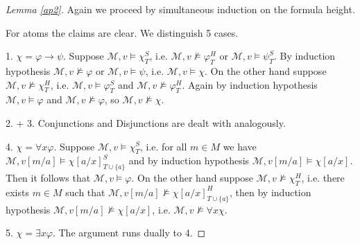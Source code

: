 \documentclass[a4paper,UKenglish,cleveref, autoref, thm-restate]{lipics-v2021}
\begin{document}
\begin{proof}[Lemma \ref{ap2}]
	Again we proceed by simultaneous induction on the formula height.
	
	For atoms the claims are clear. We distinguish 5 cases.
	
	1. $\chi = \varphi\to\psi$. Suppose $\mathcal M, v\models\chi^S_T$, i.e. $\mathcal M, v\not\models\varphi^H_T$ or $\mathcal M, v\models\psi^S_T$. By induction hypothesis $\mathcal M, v\not\models \varphi$ or $\mathcal M, v\models\psi$, i.e. $\mathcal M, v\models \chi$. On the other hand suppose $\mathcal M, v\not\models\chi^H_T$, i.e. $\mathcal M, v\models\varphi^S_T$ and $\mathcal M, v\not\models\varphi^H_T$. Again by induction hypothesis $\mathcal M,v\models\varphi$ and $\mathcal M, v\not\models \varphi$, so $\mathcal M, v\not\models\chi$.
	
	2. + 3. Conjunctions and Disjunctions are dealt with analogously.
	
	4. $\chi = \forall x\varphi$.  Suppose $\mathcal M, v\models\chi^S_T$, i.e. for all $m\in M$ we have $\mathcal M, v[m/a]\models \chi[a/x]^S_{T\cup\{a\}}$ and by induction hypothesis $\mathcal M, v[m/a]\models \chi[a/x]$. Then it follows that $\mathcal M, v\models\varphi$. On the other hand suppose $\mathcal M, v\not\models\chi^H_T$, i.e. there exists $m\in M$ such that $\mathcal M, v[m/a]\not\models\chi[a/x]^H_{T\cup \{a\}}$, then by induction hypothesis $\mathcal M, v[m/a]\not\models \chi[a/x]$, i.e. $\mathcal M, v\not\models\forall x\chi$.
	
	5. $\chi = \exists x\varphi$.  The argument runs dually to 4.
\end{proof}
\end{document}
